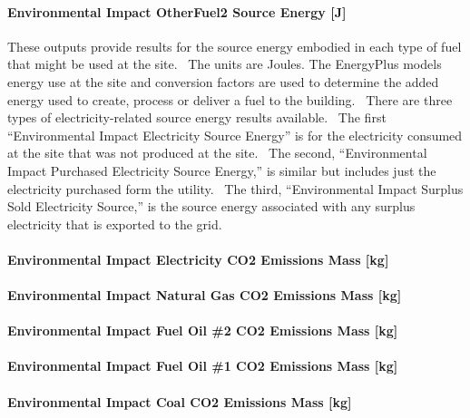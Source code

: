\paragraph{Environmental Impact OtherFuel2 Source Energy {[}J{]}}\label{environmental-impact-otherfuel2-source-energy-j}

These outputs provide results for the source energy embodied in each type of fuel that might be used at the site.~ The units are Joules. The EnergyPlus models energy use at the site and conversion factors are used to determine the added energy used to create, process or deliver a fuel to the building.~ There are three types of electricity-related source energy results available.~ The first ``Environmental Impact Electricity Source Energy'' is for the electricity consumed at the site that was not produced at the site.~ The second, ``Environmental Impact Purchased Electricity Source Energy,'' is similar but includes just the electricity purchased form the utility.~ The third, ``Environmental Impact Surplus Sold Electricity Source,'' is the source energy associated with any surplus electricity that is exported to the grid.

\paragraph{Environmental Impact Electricity CO2 Emissions Mass {[}kg{]}}\label{environmental-impact-electricity-co2-emissions-mass-kg}

\paragraph{Environmental Impact Natural Gas CO2 Emissions Mass {[}kg{]}}\label{environmental-impact-natural-gas-co2-emissions-mass-kg}

\paragraph{Environmental Impact Fuel Oil \#2 CO2 Emissions Mass {[}kg{]}}\label{environmental-impact-fuel-oil-2-co2-emissions-mass-kg}

\paragraph{Environmental Impact Fuel Oil \#1 CO2 Emissions Mass {[}kg{]}}\label{environmental-impact-fuel-oil-1-co2-emissions-mass-kg}

\paragraph{Environmental Impact Coal CO2 Emissions Mass {[}kg{]}}\label{environmental-impact-coal-co2-emissions-mass-kg}

